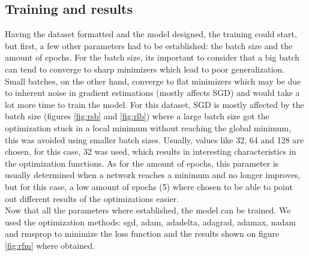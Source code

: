 \documentclass{article}
\begin{document}
\subsection{Training and results}
Having the dataset formatted and the model designed, the training could start, but first, a few other parameters had to be established: the batch size and the amount of epochs. For the batch size, its important to consider that a big batch can tend to converge to sharp minimizers which lead to poor generalization. Small batches, on the other hand, converge to flat minimizers which may be due to inherent noise in gradient estimations (mostly affects SGD) \cite{KeskarMNST16} and would take a lot more time to train the model. For this dataset, SGD is mostly affected by the batch size (figures \ref{fig:rsb} and \ref{fig:rlb}) where a large batch size got the optimization stuck in a local minimum without reaching the global minimum, this was avoided using smaller batch sizes. Usually, values like 32, 64 and 128 are chosen, for this case, 32 was used, which results in interesting characteristics in the optimization functions. As for the amount of epochs, this parameter is usually determined when a network reaches a minimum and no longer improves, but for this case, a low amount of epochs (5) where chosen to be able to point out different results of the optimizations easier. \\
Now that all the parameters where established, the model can be trained. We used the optimization methods: sgd, adam, adadelta, adagrad, adamax, nadam and rmsprop to minimize the loss function and the results shown on figure \ref{fig:rfm} where obtained.
\end{document}
